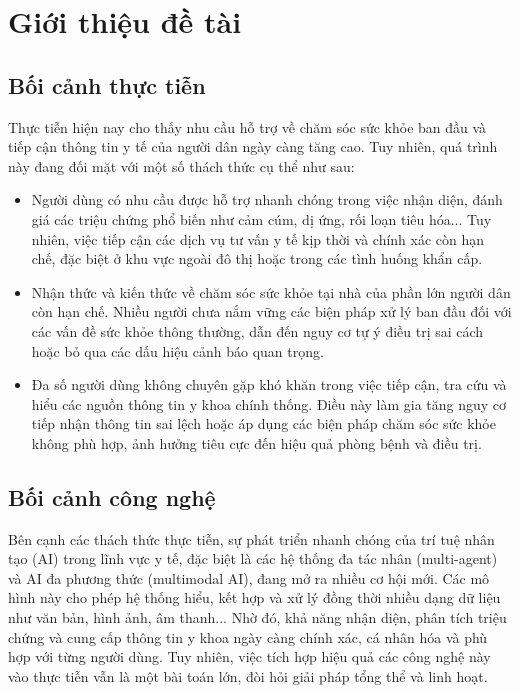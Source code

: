 \chapter{Giới thiệu đề tài}

\section{Bối cảnh thực tiễn}

Thực tiễn hiện nay cho thấy nhu cầu hỗ trợ về chăm sóc sức khỏe ban đầu và tiếp cận thông tin y tế của người dân ngày càng tăng cao. Tuy nhiên, quá trình này đang đối mặt với một số thách thức cụ thể như sau:

\begin{itemize}
    \item Người dùng có nhu cầu được hỗ trợ nhanh chóng trong việc nhận diện, đánh giá các triệu chứng phổ biến như cảm cúm, dị ứng, rối loạn tiêu hóa... Tuy nhiên, việc tiếp cận các dịch vụ tư vấn y tế kịp thời và chính xác còn hạn chế, đặc biệt ở khu vực ngoài đô thị hoặc trong các tình huống khẩn cấp.
    
    \item Nhận thức và kiến thức về chăm sóc sức khỏe tại nhà của phần lớn người dân còn hạn chế. Nhiều người chưa nắm vững các biện pháp xử lý ban đầu đối với các vấn đề sức khỏe thông thường, dẫn đến nguy cơ tự ý điều trị sai cách hoặc bỏ qua các dấu hiệu cảnh báo quan trọng.
    
    \item Đa số người dùng không chuyên gặp khó khăn trong việc tiếp cận, tra cứu và hiểu các nguồn thông tin y khoa chính thống. Điều này làm gia tăng nguy cơ tiếp nhận thông tin sai lệch hoặc áp dụng các biện pháp chăm sóc sức khỏe không phù hợp, ảnh hưởng tiêu cực đến hiệu quả phòng bệnh và điều trị.
\end{itemize}

\section{Bối cảnh công nghệ}

Bên cạnh các thách thức thực tiễn, sự phát triển nhanh chóng của trí tuệ nhân tạo (AI) trong lĩnh vực y tế, đặc biệt là các hệ thống đa tác nhân (multi-agent) và AI đa phương thức (multimodal AI), đang mở ra nhiều cơ hội mới. Các mô hình này cho phép hệ thống hiểu, kết hợp và xử lý đồng thời nhiều dạng dữ liệu như văn bản, hình ảnh, âm thanh... Nhờ đó, khả năng nhận diện, phân tích triệu chứng và cung cấp thông tin y khoa ngày càng chính xác, cá nhân hóa và phù hợp với từng người dùng. Tuy nhiên, việc tích hợp hiệu quả các công nghệ này vào thực tiễn vẫn là một bài toán lớn, đòi hỏi giải pháp tổng thể và linh hoạt.

